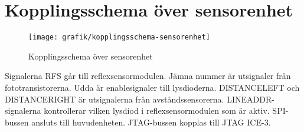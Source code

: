\section{Kopplingsschema över sensorenhet}

\begin{figure}[h]
\center
\texttt{[image: grafik/kopplingsschema-sensorenhet]}
\caption{Kopplingsschema över sensorenhet}
\end{figure}

Signalerna RFS går till reflexsensormodulen. Jämna nummer är utsignaler från fototransistorerna. Udda är enablesignaler till lysdioderna. DISTANCELEFT och DISTANCERIGHT är utsignalerna från avståndssensorerna. LINEADDR-signalerna kontrollerar vilken lysdiod i reflexsensormodulen som är aktiv. SPI-bussen ansluts till huvudenheten. JTAG-bussen kopplas till JTAG ICE-3.
